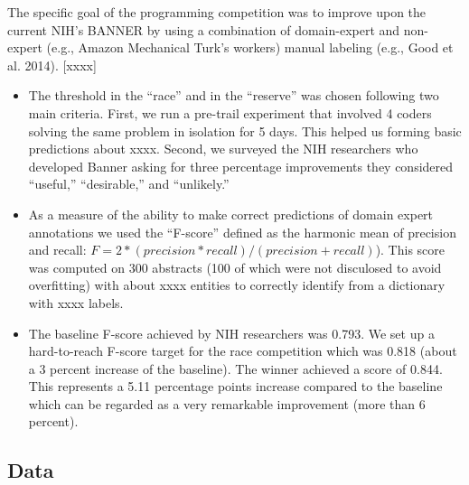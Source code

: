 \documentclass[10pt, titlepage]{article}
\begin{document}
The specific goal of the programming competition was to improve upon the
current NIH's BANNER by using a combination of domain-expert and
non-expert (e.g., Amazon Mechanical Turk's workers) manual labeling
(e.g., Good et al. 2014). {[}xxxx{]}

\begin{itemize}
\item
  The threshold in the ``race'' and in the ``reserve'' was chosen
  following two main criteria. First, we run a pre-trail experiment that
  involved 4 coders solving the same problem in isolation for 5 days.
  This helped us forming basic predictions about xxxx. Second, we
  surveyed the NIH researchers who developed Banner asking for three
  percentage improvements they considered ``useful,'' ``desirable,'' and
  ``unlikely.''
\item
  As a measure of the ability to make correct predictions of domain
  expert annotations we used the ``F-score'' defined as the harmonic
  mean of precision and recall:
  \(F = 2 * (precision * recall) / (precision + recall)\)). This score
  was computed on 300 abstracts (100 of which were not disculosed to
  avoid overfitting) with about xxxx entities to correctly identify from
  a dictionary with xxxx labels.
\item
  The baseline F-score achieved by NIH researchers was 0.793. We set up
  a hard-to-reach F-score target for the race competition which was
  0.818 (about a 3 percent increase of the baseline). The winner
  achieved a score of 0.844. This represents a 5.11 percentage points
  increase compared to the baseline which can be regarded as a very
  remarkable improvement (more than 6 percent).
\end{itemize}

\subsection{Data}\label{data}
\end{document}
